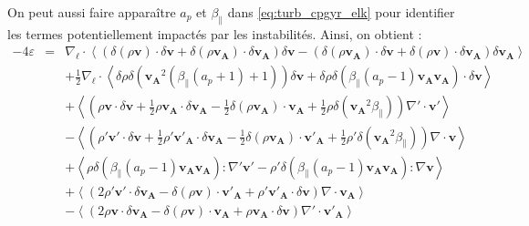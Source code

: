 On peut aussi faire apparaître $a_p$ et $\beta_{\parallel}$ dans \eqref{eq:turb_cpgyr_elk} pour identifier les termes potentiellement impactés par les instabilités. Ainsi, on obtient :  
\begin{equation}
\label{eq:turb_cpinst_elk} \boxed{
\begin{array}{lcl}
- 4\varepsilon &=& \nabla_{\boldsymbol{\ell}} \cdot \left<\left(\delta \left(\rho\boldsymbol{v}\right) \cdot \delta \boldsymbol{v}+ \delta \left(\rho\boldsymbol{v_A}\right) \cdot \delta \boldsymbol{v_A} \right) \delta \boldsymbol{v}  -\left(\delta \left(\rho\boldsymbol{v_A}\right) \cdot \delta \boldsymbol{v}  + \delta \left(\rho\boldsymbol{v}\right) \cdot \delta \boldsymbol{v_A}  \right) \delta \boldsymbol{v_A} \right>\\
&&+ \frac{1}{2}\nabla_{\boldsymbol{\ell}} \cdot \left< \delta \rho  \delta \left(\boldsymbol{v_A}^2 \left(\beta_{\parallel}\left(a_p+1\right)+1\right)\right) \delta \boldsymbol{v}+\delta \rho \delta \left(\beta_{\parallel}\left(a_p-1\right) \boldsymbol{v_A} \boldsymbol{v_A}\right) \cdot \delta \boldsymbol{v} \right> \\
&& +\left< \left(\rho \boldsymbol{v} \cdot \delta \boldsymbol{v} +\frac{1}{2} \rho \boldsymbol{v_A} \cdot  \delta \boldsymbol{v_A} -\frac{1}{2} \delta \left(\rho \boldsymbol{v_A}\right) \cdot \boldsymbol{v_A} + \frac{1}{2}\rho \delta \left(\boldsymbol{v_A}^2 \beta_{\parallel}\right)\right) \nabla' \cdot \boldsymbol{v'} \right>\\
 && -\left< \left(\rho' \boldsymbol{v'} \cdot \delta \boldsymbol{v}  + \frac{1}{2} \rho' \boldsymbol{v'_A} \cdot \delta \boldsymbol{v_A}  - \frac{1}{2} \delta \left(\rho \boldsymbol{v_A}\right) \cdot \boldsymbol{v'_A}  + \frac{1}{2} \rho' \delta \left(\boldsymbol{v_A}^2 \beta_{\parallel}\right)\right)\nabla \cdot \boldsymbol{v} \right>\\
 &&+\left<\rho \delta \left(\beta_{\parallel}\left(a_p-1\right) \boldsymbol{v_A} \boldsymbol{v_A}\right):\nabla' \boldsymbol{v'} - \rho' \delta \left(\beta_{\parallel}\left(a_p-1\right) \boldsymbol{v_A} \boldsymbol{v_A}\right) :\nabla  \boldsymbol{v}\right>\\
&&+ \left<\left(2 \rho' \boldsymbol{v'} \cdot \delta \boldsymbol{v_A}- \delta \left(\rho \boldsymbol{v}\right) \cdot \boldsymbol{v'_A} + \rho' \boldsymbol{v'_A} \cdot \delta \boldsymbol{v}  \right)\nabla \cdot \boldsymbol{v_A}\right>\\
 &&- \left<\left(2\rho \boldsymbol{v} \cdot \delta \boldsymbol{v_A} - \delta \left(\rho \boldsymbol{v}\right) \cdot \boldsymbol{v_A} +  \rho \boldsymbol{v_A} \cdot \delta \boldsymbol{v} \right)\nabla' \cdot \boldsymbol{v'_A}\right> \\

\end{array}}
\end{equation}
